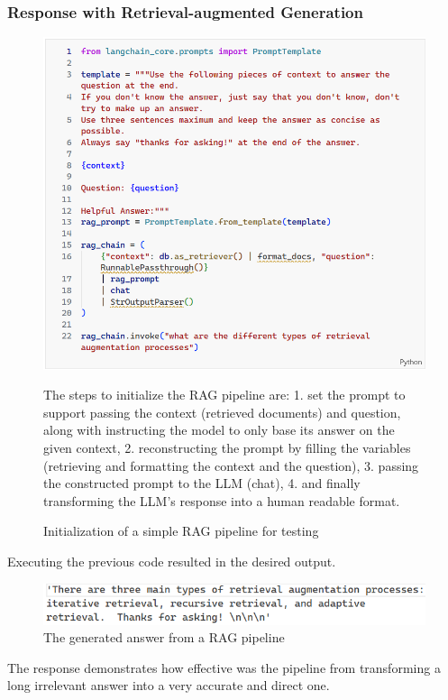 \subsubsection{Response with Retrieval-augmented Generation}
\begin{figure}[H]
    \centering
    \includegraphics[width=.9\linewidth]{./figures/rag-code.png}
    \caption{Initialization of a simple RAG pipeline for testing}
    \begin{flushleft}
        \small The steps to initialize the RAG pipeline are: 1. set the prompt to support passing the context (retrieved documents) and question, along with instructing the model to only base its answer on the given context, 2. reconstructing the prompt by filling the variables (retrieving and formatting the context and the question), 3. passing the constructed prompt to the LLM (chat), 4. and finally transforming the LLM's response into a human readable format.
    \end{flushleft}
\end{figure}
Executing the previous code resulted in the desired output.
\begin{figure}[H]
    \centering
    \includegraphics[width=\linewidth]{./figures/rag-answer.png}
    \caption{The generated answer from a RAG pipeline}
\end{figure}
The response demonstrates how effective was the pipeline from transforming a long irrelevant answer into a very accurate and direct one.
